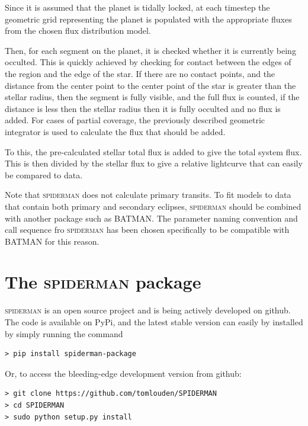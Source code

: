 \documentclass[a4paper,fleqn,usenatbib]{mnras}
\begin{document}
Since it is assumed that the planet is tidally locked, at each timestep the geometric grid representing the planet is populated with the appropriate fluxes from the chosen flux distribution model.

Then, for each segment on the planet, it is checked whether it is currently being occulted. This is quickly achieved by checking for contact between the edges of the region and the edge of the star. If there are no contact points, and the distance from the center point to the center point of the star is greater than the stellar radius, then the segment is fully visible, and the full flux is counted, if the distance is less then the stellar radius then it is fully occulted and no flux is added. For cases of partial coverage, the previously described geometric integrator is used to calculate the flux that should be added.

To this, the pre-calculated stellar total flux is added to give the total system flux. This is then divided by the stellar flux to give a relative lightcurve that can easily be compared to data.

Note that \textsc{spiderman} does not calculate primary transits. To fit models to data that contain both primary and secondary eclipses, \textsc{spiderman} should be combined with another package such as BATMAN. The parameter naming convention and call sequence fro \textsc{spiderman} has been chosen specifically to be compatible with BATMAN for this reason. 

\section{The \textsc{spiderman} package}\label{sec:package}

\textsc{spiderman} is an open source project and is being actively developed on github. The code is available on PyPi, and the latest stable version can easily by installed by simply running the command 

\begin{Verbatim}[frame=single]
> pip install spiderman-package
\end{Verbatim}

Or, to access the bleeding-edge development version from github:

\begin{Verbatim}[frame=single]
> git clone https://github.com/tomlouden/SPIDERMAN
> cd SPIDERMAN
> sudo python setup.py install
\end{Verbatim}
\end{document}
